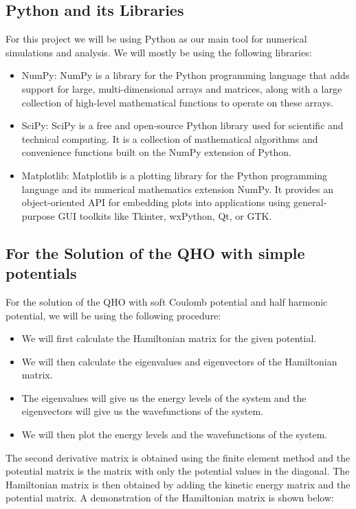 \documentclass{article}
\begin{document}
\begin{multicols}{2}
\subsection{\label{Python}Python and its Libraries}
For this project we will be using Python as our main tool for numerical simulations and analysis. We will mostly be using the following libraries:
\begin{itemize}
    \item NumPy: NumPy is a library for the Python programming language that adds support for large, multi-dimensional arrays and matrices, along with a large collection of high-level mathematical functions to operate on these arrays.
    \item SciPy: SciPy is a free and open-source Python library used for scientific and technical computing. It is a collection of mathematical algorithms and convenience functions built on the NumPy extension of Python.
    \item Matplotlib: Matplotlib is a plotting library for the Python programming language and its numerical mathematics extension NumPy. It provides an object-oriented API for embedding plots into applications using general-purpose GUI toolkits like Tkinter, wxPython, Qt, or GTK.
\end{itemize}


\subsection{For the Solution of the QHO with simple potentials}

For the solution of the QHO with soft Coulomb potential and half harmonic potential, we will be using the following procedure:
\begin{itemize}
    \item We will first calculate the Hamiltonian matrix for the given potential.
    \item We will then calculate the eigenvalues and eigenvectors of the Hamiltonian matrix.
    \item The eigenvalues will give us the energy levels of the system and the eigenvectors will give us the wavefunctions of the system.
    \item We will then plot the energy levels and the wavefunctions of the system.
\end{itemize}


The second derivative matrix is obtained using the finite element method and the potential matrix is the matrix with only the potential values in the diagonal. The Hamiltonian matrix is then obtained by adding the kinetic energy matrix and the potential matrix. A demonstration of the Hamiltonian matrix is shown below:


\end{multicols}
\end{document}
